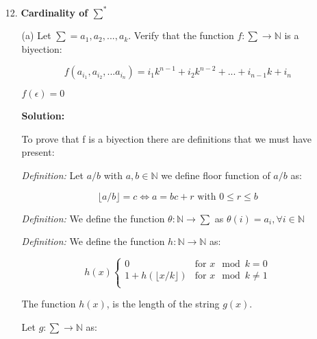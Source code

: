 \documentclass[9pt,tikz,border=2mm]{article}
\begin{document}
\begin{enumerate}
\begin{enumerate}
            \end{enumerate}


       
        \item[12.] \textbf{Cardinality of $\sum^*$}
            \begin{enumerate}
                \item[(a)] Let $\sum = {a_1,a_2,...,a_k}$. Verify that the function $f:\sum \to \mathbb{N}$ is a biyection:

                    \[
                        f(a_{i_1},a_{i_2},...a_{i_n}) = i_1k^{n-1}+i_2k^{n-2}+...+i_{n-1}k+i_n
                    \]

                $f(\epsilon)=0$
                
                \textbf{Solution:}\newline

                To prove that f is a biyection there are definitions that we must have present:\newline
                
                \textit{Definition: }Let $a/b$ with $a,b \in \mathbb{N}$ we define floor function of $a/b$ as:
                    
                    \[
                        \lfloor{a/b}\rfloor=c \iff a = bc + r \text{  with  } 0\leq r \leq b
                    \]

                \textit{Definition: }We define the function $\theta: \mathbb{N} \to \sum$ as $\theta(i) = a_i, \forall i \in \mathbb{N}$\newline

                 \textit{Definition: }We define the function $h: \mathbb{N} \to \mathbb{N}$ as:\newline 

                    \[  h(x)
                        \begin{cases}
                            0 & \text{for }  x \mod k = 0\\
                            1 + h(\lfloor{x/k}\rfloor) & \text{for } x \mod k \neq 1 \\
                        \end{cases}
                    \]

                    The function $h(x)$, is the length of the string $g(x)$.\newline

                Let $g:\sum \to \mathbb{N}$ as:


\end{enumerate}
\end{enumerate}
\end{document}

